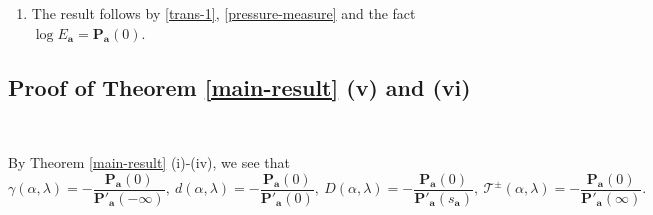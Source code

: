\documentclass[reqno,11pt,graphicx,]{amsart}
\numberwithin{equation}{section}
\theoremstyle{plain}
\newcommand{\p}{\mathbf P}
\newcommand{\3}{\mathbf{3}}
\newcommand{\ma}{\mathbf{a}}
\begin{document}
\begin{enumerate}[label=(\roman*)]
		\item The result follows by \eqref{trans-1}, \eqref{pressure-measure} and the fact $\log E_{\ma}=\p_{\ma}(0)$.
		
	\end{enumerate}
	\subsection{Proof of Theorem \ref{main-result} (v) and (vi)}\
	
	By Theorem \ref{main-result} (i)-(iv), we see that
	\begin{equation*}
		\gamma(\alpha,\lambda)=-\frac{\p_{\ma}(0)}{\p'_{\ma}(-\infty)},\ d(\alpha,\lambda)=-\frac{\p_{\ma}(0)}{\p'_{\ma}(0)},\ D(\alpha,\lambda)=-\frac{\p_{\ma}(0)}{\p'_{\ma}(s_{\ma})},\	\mathcal{T}^{\pm}(\alpha,\lambda)=-\frac{\p_{\ma}(0)}{\p'_{\ma}(\infty)}.
	\end{equation*}
	
\end{document}
